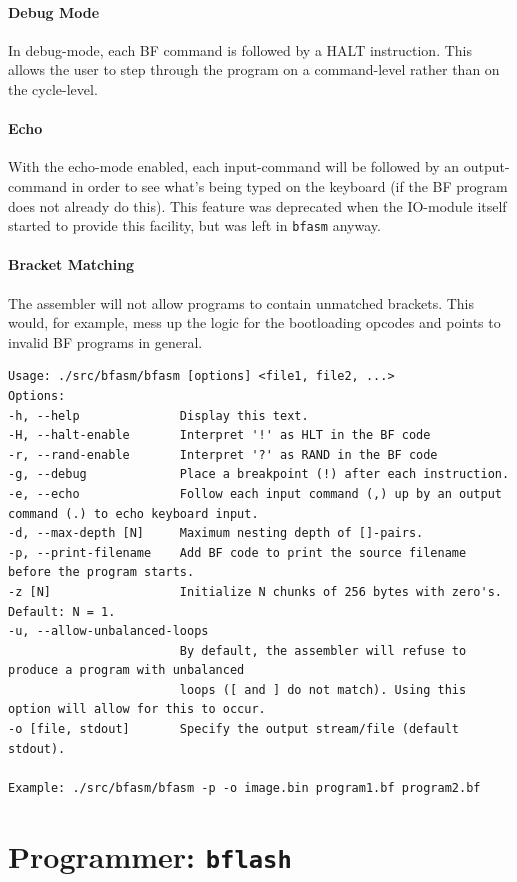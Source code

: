 \paragraph{Debug Mode} In debug-mode, each BF command is followed by a HALT instruction. This allows the user to step through the program on a command-level rather than on the cycle-level.
\paragraph{Echo} With the echo-mode enabled, each input-command will be followed by an output-command in order to see what's being typed on the keyboard (if the BF program does not already do this). This feature was deprecated when the IO-module itself started to provide this facility, but was left in \texttt{bfasm} anyway.
\paragraph{Bracket Matching} The assembler will not allow programs to contain unmatched brackets. This would, for example, mess up the logic for the bootloading opcodes and points to invalid BF programs in general.

\vspace{1cm}
\begin{lstlisting}
Usage: ./src/bfasm/bfasm [options] <file1, file2, ...>
Options:
-h, --help              Display this text.
-H, --halt-enable       Interpret '!' as HLT in the BF code
-r, --rand-enable       Interpret '?' as RAND in the BF code
-g, --debug             Place a breakpoint (!) after each instruction.
-e, --echo              Follow each input command (,) up by an output command (.) to echo keyboard input.
-d, --max-depth [N]     Maximum nesting depth of []-pairs.
-p, --print-filename    Add BF code to print the source filename before the program starts.
-z [N]                  Initialize N chunks of 256 bytes with zero's. Default: N = 1.
-u, --allow-unbalanced-loops
                        By default, the assembler will refuse to produce a program with unbalanced
                        loops ([ and ] do not match). Using this option will allow for this to occur.
-o [file, stdout]       Specify the output stream/file (default stdout).

Example: ./src/bfasm/bfasm -p -o image.bin program1.bf program2.bf
\end{lstlisting}

\newpage
\section{Programmer: \texttt{bflash}} \label{sec:utilities:bflash}

